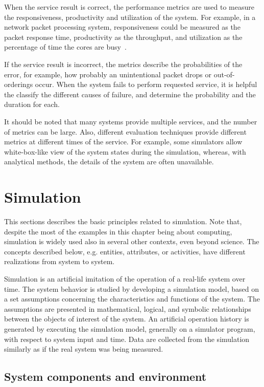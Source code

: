 When the service result is correct, the performance metrics are used to measure the responsiveness, productivity and utilization of the system. For example, in a network packet processing system, responsiveness could be measured as the packet response time, productivity as the throughput, and utilization as the percentage of time the cores are busy~\cite{cavium:2010:fundamentals}.~\cite{jain:1991:AOCSPA}

If the service result is incorrect, the metrics describe the probabilities of the error, for example, how probably an unintentional packet drops or out-of-orderings occur. When the system fails to perform requested service, it is helpful the classify the different causes of failure, and determine the probability and the duration for each.~\cite{jain:1991:AOCSPA}

It should be noted that many systems provide multiple services, and the number of metrics can be large. Also, different evaluation techniques provide different metrics at different times of the service. For example, some simulators allow white-box-like view of the system states during the simulation, whereas, with analytical methods, the details of the system are often unavailable.~\cite{jain:1991:AOCSPA}

\section{Simulation}
This sections describes the basic principles related to simulation. Note that, despite the most of the examples in this chapter being about computing, simulation is widely used also in several other contexts, even beyond science. The concepts described below, e.g. entities, attributes, or activities, have different realizations from system to system.

Simulation is an artificial imitation of the operation of a real-life system over time. The system behavior is studied by developing a simulation model, based on a set assumptions concerning the characteristics and functions of the system. The assumptions are presented in mathematical, logical, and symbolic relationships between the objects of interest of the system. An artificial operation history is generated by executing the simulation model, generally on a simulator program, with respect to system input and time. Data are collected from the simulation similarly as if the real system was being measured.

\subsection{System components and environment}
\label{sec:syst-comp-envir}

